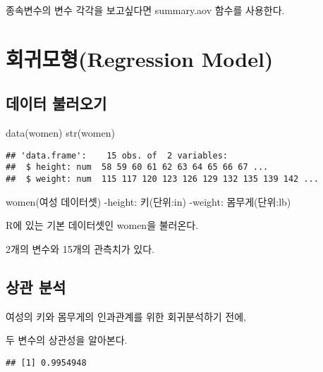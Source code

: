 \documentclass[
]{article}
\newenvironment{Shaded}{\begin{snugshade}}{\end{snugshade}}
\newcommand{\FunctionTok}[1]{\textcolor[rgb]{0.00,0.00,0.00}{#1}}
\newcommand{\NormalTok}[1]{#1}
\newcommand{\SpecialCharTok}[1]{\textcolor[rgb]{0.00,0.00,0.00}{#1}}
\begin{document}
종속변수의 변수 각각을 보고싶다면 summary.aov 함수를 사용한다.

\hypertarget{uxd68cuxadc0uxbaa8uxd615regression-model}{%
\section{회귀모형(Regression Model)}\label{uxd68cuxadc0uxbaa8uxd615regression-model}}

\hypertarget{uxb370uxc774uxd130-uxbd88uxb7ecuxc624uxae30-6}{%
\subsection{데이터 불러오기}\label{uxb370uxc774uxd130-uxbd88uxb7ecuxc624uxae30-6}}

\begin{Shaded}
\begin{Highlighting}[]
\FunctionTok{data}\NormalTok{(women)}
\FunctionTok{str}\NormalTok{(women)}
\end{Highlighting}
\end{Shaded}

\begin{verbatim}
## 'data.frame':    15 obs. of  2 variables:
##  $ height: num  58 59 60 61 62 63 64 65 66 67 ...
##  $ weight: num  115 117 120 123 126 129 132 135 139 142 ...
\end{verbatim}

women(여성 데이터셋)
-height: 키(단위:in)
-weight: 몸무게(단위:lb)

R에 있는 기본 데이터셋인 women을 불러온다.

2개의 변수와 15개의 관측치가 있다.

\hypertarget{uxc0c1uxad00-uxbd84uxc11d}{%
\subsection{상관 분석}\label{uxc0c1uxad00-uxbd84uxc11d}}

여성의 키와 몸무게의 인과관계를 위한 회귀분석하기 전에,

두 변수의 상관성을 알아본다.

\begin{Shaded}
\end{Shaded}

\begin{verbatim}
## [1] 0.9954948
\end{verbatim}
\end{document}
